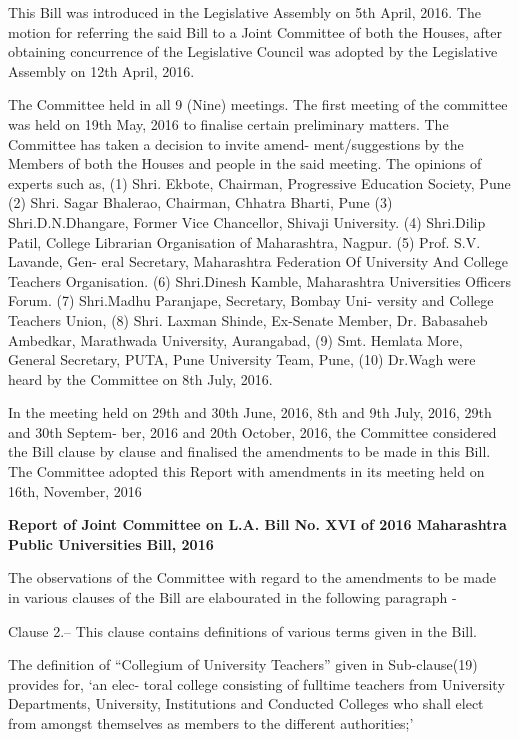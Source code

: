 \documentclass[default]{mhact}
\begin{document}
{      This Bill was introduced in the Legislative Assembly on 5th
      April, 2016. The motion for referring the said Bill to a Joint
      Committee of both the Houses, after obtaining concurrence of the
      Legislative Council was adopted by the Legislative Assembly on
      12th April, 2016.

      The Committee held in all 9 (Nine) meetings. The first meeting
      of the committee was held on 19th May, 2016 to finalise certain
      preliminary matters. The Committee has taken a decision to
      invite amend- ment/suggestions by the Members of both the Houses
      and people in the said meeting. The opinions of experts such as,
      (1) Shri. Ekbote, Chairman, Progressive Education Society, Pune
      (2) Shri. Sagar Bhalerao, Chairman, Chhatra Bharti, Pune (3)
      Shri.D.N.Dhangare, Former Vice Chancellor, Shivaji University.
      (4) Shri.Dilip Patil, College Librarian Organisation of
      Maharashtra, Nagpur. (5) Prof. S.V. Lavande, Gen- eral
      Secretary, Maharashtra Federation Of University And College
      Teachers Organisation. (6) Shri.Dinesh Kamble, Maharashtra
      Universities Officers Forum. (7) Shri.Madhu Paranjape,
      Secretary, Bombay Uni- versity and College Teachers Union, (8)
      Shri. Laxman Shinde, Ex-Senate Member, Dr. Babasaheb Ambedkar,
      Marathwada University, Aurangabad, (9) Smt. Hemlata More,
      General Secretary, PUTA, Pune University Team, Pune, (10)
      Dr.Wagh were heard by the Committee on 8th July, 2016.

      In the meeting held on 29th and 30th June, 2016, 8th and 9th
      July, 2016, 29th and 30th Septem- ber, 2016 and 20th October,
      2016, the Committee considered the Bill clause by clause and
      finalised the amendments to be made in this Bill. The Committee
      adopted this Report with amendments in its meeting held on 16th,
      November, 2016

      \begin{center}
        \textbf{Report of Joint Committee on L.A. Bill No. XVI of 2016
          Maharashtra Public Universities Bill, 2016}
      \end{center}
      The observations of the Committee with regard to the amendments
      to be made in various clauses of the Bill are elabourated in the
      following paragraph -

      Clause 2.– This clause contains definitions of various terms
      given in the Bill.

      The definition of ``Collegium of University Teachers'' given in
      Sub-clause(19) provides for, `an elec- toral college consisting
      of fulltime teachers from University Departments, University,
      Institutions and Conducted Colleges who shall elect from amongst
      themselves as members to the different authorities;'

}
\end{document}
